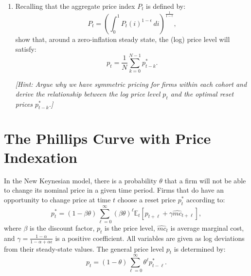 \documentclass[dvipsnames,11pt]{article}
\begin{document}
\begin{enumerate}
\begin{solution}
                
                
            \end{solution}
    
        \item Recalling that the aggregate price index \( P_t \) is defined by:
        \[
        P_t = \left( \int_0^1 P_t(i)^{1 - \epsilon} \, di \right)^{\frac{1}{1 - \epsilon}},
        \]
        show that, around a zero-inflation steady state, the (log) price level will satisfy:
        \[
        p_t = \frac{1}{N} \sum_{k=0}^{N-1} p_{t-k}^*.
        \]
    
        \textit{[Hint: Argue why we have symmetric pricing for firms within each cohort and derive the relationship between the log price level \( p_t \) and the optimal reset prices \( p_{t-k}^* \).]}
    
            \begin{solution}
    
                
                
            \end{solution}
    
    \end{enumerate}

\section{The Phillips Curve with Price Indexation}

    In the New Keynesian model, there is a probability $\theta$ that a firm will not be able to change its nominal price in a given time period. Firms that do have an opportunity to change price at time $t$ choose a reset price $p^*_t$ according to:
    \[
    p^*_t = (1 - \beta \theta) \sum_{\ell=0}^\infty (\beta \theta)^\ell \mathbb{E}_t [p_{t+\ell} + \gamma \widehat{mc}_{t + \ell }],
    \]
    where $\beta$ is the discount factor, $p_t$ is the price level, $\widehat{mc}_t$ is average marginal cost, and $\gamma = \frac{1 - \alpha}{1 - \alpha + \alpha \epsilon}$ is a positive coefficient. All variables are given as log deviations from their steady-state values. The general price level $p_t$ is determined by:
    \[
    p_t = (1 - \theta) \sum_{\ell=0}^\infty \theta^\ell p^*_{t-\ell}.
    \]
\end{document}
